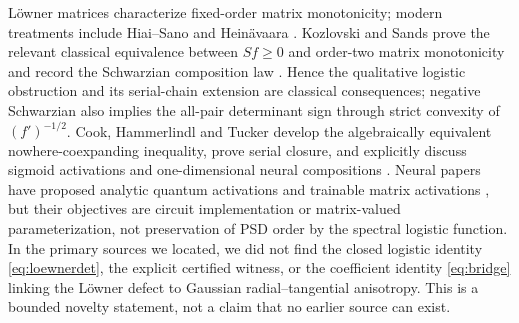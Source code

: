\documentclass[11pt]{article}
\begin{document}
L\"owner matrices characterize fixed-order matrix monotonicity; modern treatments include Hiai--Sano and
Hein\"avaara \cite{hiai2010,heinavaara2019}.  Kozlovski and Sands prove the relevant classical equivalence between
$Sf\ge0$ and order-two matrix monotonicity and record the Schwarzian composition law
\cite{kozlovski2008}.  Hence the qualitative logistic obstruction and its serial-chain extension are classical
consequences; negative Schwarzian also implies the all-pair determinant sign through strict convexity of
$(f')^{-1/2}$.  Cook, Hammerlindl and Tucker develop the algebraically equivalent nowhere-coexpanding inequality,
prove serial closure, and explicitly discuss sigmoid activations and one-dimensional neural compositions
\cite{cook2023}.  Neural papers have proposed analytic
quantum activations and trainable matrix activations \cite{maronese2022,liu2021}, but their objectives are circuit
implementation or matrix-valued parameterization, not preservation of PSD order by the spectral logistic function.
In the primary sources we located, we did not find the closed logistic identity \eqref{eq:loewnerdet}, the explicit
certified witness, or the coefficient identity \eqref{eq:bridge} linking the L\"owner defect to Gaussian
radial--tangential anisotropy.  This is a bounded novelty statement, not a claim that no earlier source can exist.
\end{document}
